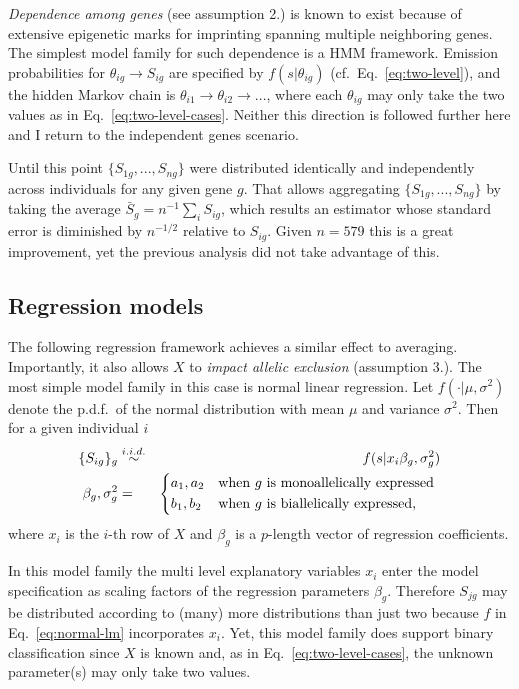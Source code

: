 \documentclass[letterpaper]{article}
\begin{document}
\emph{Dependence among genes} (see assumption 2.) is known to exist because of extensive epigenetic
marks for imprinting spanning multiple neighboring genes.  The simplest model
family for such dependence is a HMM framework.  Emission probabilities for
\(\theta_{ig}\rightarrow S_{ig}\) are specified by \(f(s | \theta_{ig})\)
(cf.~Eq.~\ref{eq:two-level}), and
the hidden Markov chain is
\(\theta_{i1}\rightarrow\theta_{i2}\rightarrow...\), where each
\(\theta_{ig}\) may only take the two values as in
Eq.~\ref{eq:two-level-cases}.  Neither this direction is followed further
here and I return to the independent genes scenario.

Until this point \(\{S_{1g},...,S_{ng}\}\) were distributed identically and
independently across individuals for any given gene \(g\).  That allows
aggregating \(\{S_{1g},...,S_{ng}\}\) by taking the average
\(\bar{S}_g=n^{-1}\sum_i S_{ig}\), which results an estimator whose standard
error is diminished by \(n^{-1/2}\) relative to \(S_{ig}\).  Given $n=579$
this is a great improvement, yet the previous analysis did not take advantage
of this.

\subsection{Regression models}
\label{sec:regression-models}

The following regression framework achieves a similar effect to averaging.
Importantly, it also allows \(X\) to \emph{impact allelic exclusion}
(assumption 3.).  The most simple model family in this case is normal linear
regression.  Let \(f(\cdot|\mu,\sigma^2)\) denote the p.d.f.~of the normal
distribution with mean \(\mu\) and variance \(\sigma^2\).  Then for a given
individual \(i\)
\begin{eqnarray}
\label{eq:normal-lm}
\{S_{ig}\}_g &\overset{i.i.d.}{\sim}& f(s | x_i \beta_g, \sigma^2_g) \\
\label{eq:shared-regression-param}
\beta_g,\sigma^2_g &=&
\begin{dcases*}
a_1, a_2 & when $g$ is monoallelically expressed \\
b_1, b_2 & when $g$ is biallelically expressed,
\end{dcases*}
\end{eqnarray}
where \(x_i\) is the \(i\)-th row of \(X\) and \(\beta_g\) is a \(p\)-length
vector of regression coefficients.

In this model family the multi level explanatory variables \(x_i\) enter the model specification as
scaling factors of the regression parameters \(\beta_g\).  Therefore \(S_{jg}\) may be distributed
according to (many) more distributions than just two because \(f\) in Eq.~\ref{eq:normal-lm}
incorporates \(x_i\).  Yet, this model family does support binary classification since \(X\) is known
and, as in Eq.~\ref{eq:two-level-cases}, the unknown parameter(s) may only take two values.
\end{document}
